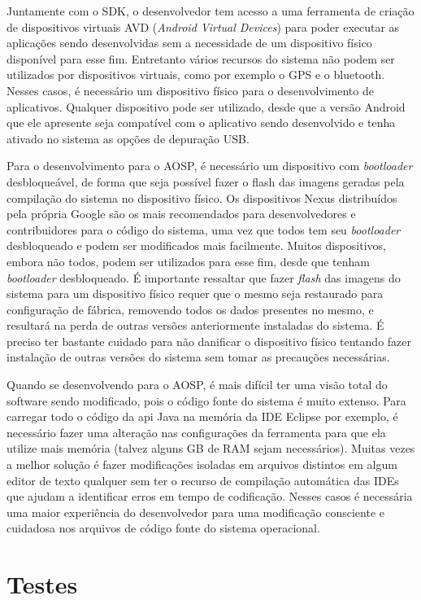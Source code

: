 \begin{apendicesenv}
Juntamente com o SDK, o desenvolvedor tem acesso a uma ferramenta de criação de dispositivos virtuais AVD (\textit{Android Virtual Devices}) para poder executar as aplicações sendo desenvolvidas sem a necessidade de um dispositivo físico disponível para esse fim. Entretanto vários recursos do sistema não podem ser utilizados por dispositivos virtuais, como por exemplo o GPS e o bluetooth. Nesses casos, é necessário um dispositivo físico para o desenvolvimento de aplicativos. Qualquer dispositivo pode ser utilizado, desde que a versão Android que ele apresente seja compatível com o aplicativo sendo desenvolvido e tenha ativado no sistema as opções de depuração USB. 

Para o desenvolvimento para o AOSP, é necessário um dispositivo com \textit{bootloader} desbloqueável, de forma que seja possível fazer o flash das imagens geradas pela compilação do sistema no dispositivo físico. Os dispositivos Nexus distribuídos pela própria Google são os mais recomendados para desenvolvedores e contribuidores para o código do sistema, uma vez que todos tem seu \textit{bootloader} desbloqueado e podem ser modificados mais facilmente. Muitos dispositivos, embora não todos, podem ser utilizados para esse fim, desde que tenham \textit{bootloader} desbloqueado. É importante ressaltar que fazer \textit{flash} das imagens do sistema para um dispositivo físico requer que o mesmo seja restaurado para configuração de fábrica, removendo todos os dados presentes no mesmo, e resultará na perda de outras versões anteriormente instaladas do sistema. É preciso ter bastante cuidado para não danificar o dispositivo físico tentando fazer instalação de outras versões do sistema sem tomar as precauções necessárias.

Quando se desenvolvendo para o AOSP, é mais difícil ter uma visão total do software sendo modificado, pois o código fonte do sistema é muito extenso. Para carregar todo o código da api Java na memória da IDE Eclipse por exemplo, é necessário fazer uma alteração nas configurações da ferramenta para que ela utilize mais memória (talvez alguns GB de RAM sejam necessários). Muitas vezes a melhor solução é fazer modificações isoladas em arquivos distintos em algum editor de texto qualquer sem ter o recurso de compilação automática das IDEs que ajudam a identificar erros em tempo de codificação. Nesses casos é necessária uma maior experiência do desenvolvedor para uma modificação consciente e cuidadosa nos arquivos de código fonte do sistema operacional.

\section{Testes}


\end{apendicesenv}
